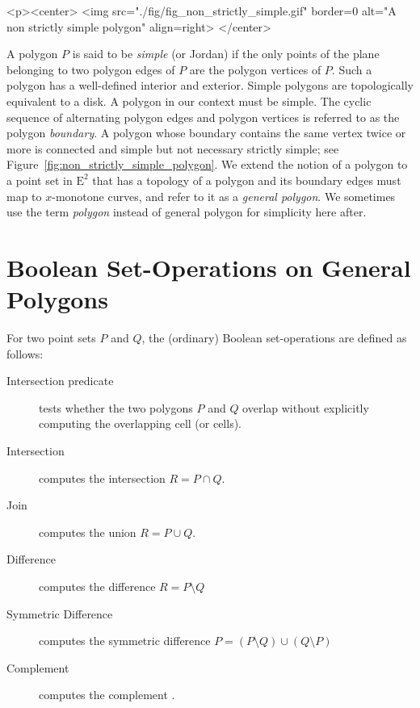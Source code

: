 \lcHtml{\label{fig:non_strictly_simple_polygon}}
\begin{ccHtmlOnly}
  <p><center>
    <img src="./fig/fig_non_strictly_simple.gif" border=0 alt="A non strictly simple polygon" align=right>
  </center>
\end{ccHtmlOnly}
A polygon $P$ is said to be {\em simple} (or Jordan) if the
only points of the plane belonging to two polygon edges of $P$ are the
polygon vertices of $P$. Such a polygon has a well-defined interior
and exterior. Simple polygons are topologically equivalent to
a disk. A polygon in our context must be simple. The cyclic
sequence of alternating polygon edges and polygon vertices is referred
to as the polygon {\em boundary}. A polygon whose boundary contains the
same vertex twice or more is connected and simple but not
necessary strictly simple; see Figure~\ref{fig:non_strictly_simple_polygon}. 
We extend the notion of a polygon to a point set in $\mathrm{E}^2$ that has 
a topology of a polygon and its boundary edges must map to $x$-monotone
curves, and refer to it as a {\em general polygon}. We sometimes use
the term {\em polygon} instead of general polygon for simplicity here
after.

\section{Boolean Set-Operations on General Polygons}
\label{bobs_sec:bops}
For two point sets $P$ and $Q$, the (ordinary) Boolean set-operations are
defined as follows:
\begin{description}
\item [Intersection predicate] tests whether the two polygons $P$ and $Q$
  overlap without explicitly computing the overlapping cell (or cells).     
\item[Intersection] computes the intersection $R = P \cap Q$.
\item[Join] computes the union $R = P \cup Q$.
\item [Difference] computes the difference $R = P \setminus Q$ 
\item [Symmetric Difference] computes the symmetric difference
  $P = (P \setminus Q) \cup (Q \setminus P)$
\item[Complement] computes the complement
.
\end{description}

